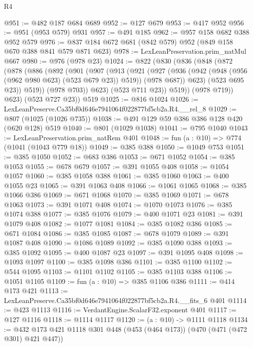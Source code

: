 \begin{lexlean}{R4}
\begin{coremodule}
@951 := @482 @187 @684 @689
@952 := @127 @679
@953 := @417 @952
@956 := @951 (@953 @579) @931
@957 := @491 @185
@962 := @957 @158 @682 @388 @952 @579
@976 := @837 @184 @672 @681 (@842 @579) @952 (@849 @158 @670 @388 @841 @579 @871 @623)
@978 := LexLeanPreservation.prim_natMul @667
@980 := @976 (@978 @23)
@1024 := @822
    (@830
      (@836
        (@848
          (@872
            (@878
              (@886
                (@892
                  (@901
                    (@907
                      (@913
                        (@921
                          (@927
                            (@936
                              (@942 (@948 (@956 (@962 @980 @623) (@523 @679 @23)) @519))
                              (@978 @687))
                            @623)
                          (@523 @695 @23))
                        @519))
                    (@978 @703))
                  @623)
                (@523 @711 @23))
              @519))
          (@978 @719))
        @623)
      (@523 @727 @23))
    @519
@1025 := @816 @1024
@1026 := LexLeanPreserve.Ca35bf0d646e7941064f022877bf5cb2a.R4.__rel_8
@1029 := @807 (@1025 (@1026 @735))
@1038 := @491 @129 @59 @386 @386 @128 @420 (@620 @128) @519
@1040 := @801 (@1029 @1038)
@1041 := @795 @1040
@1043 := LexLeanPreservation.prim_natRem @401
@1048 := fun (a : @10) => @774 (@1041 (@1043 @779 @18))
@1049 := @385 @388
@1050 := @1049 @753
@1051 := @385 @1050
@1052 := @683 @386
@1053 := @671 @1052
@1054 := @385 @1053
@1055 := @678 @679
@1057 := @391 @1055 @408
@1058 := @1054 @1057
@1060 := @385 @1058 @388
@1061 := @385 @1060
@1063 := @400 @1055 @23
@1065 := @391 @1063 @408
@1066 := @1061 @1065
@1068 := @385 @1066 @386
@1069 := @671 @1068
@1070 := @385 @1069
@1071 := @678 @1063
@1073 := @391 @1071 @408
@1074 := @1070 @1073
@1076 := @385 @1074 @388
@1077 := @385 @1076
@1079 := @400 @1071 @23
@1081 := @391 @1079 @408
@1082 := @1077 @1081
@1084 := @385 @1082 @386
@1085 := @671 @1084
@1086 := @385 @1085
@1087 := @678 @1079
@1089 := @391 @1087 @408
@1090 := @1086 @1089
@1092 := @385 @1090 @388
@1093 := @385 @1092
@1095 := @400 @1087 @23
@1097 := @391 @1095 @408
@1098 := @1093 @1097
@1100 := @385 @1098 @386
@1101 := @385 @1100
@1102 := @544 @1095
@1103 := @1101 @1102
@1105 := @385 @1103 @388
@1106 := @1051 @1105
@1109 := fun (a : @10) => @385 @1106 @386
@1111 := @414 @173 @421
@1113 := LexLeanPreserve.Ca35bf0d646e7941064f022877bf5cb2a.R4.__fits_6 @401
@1114 := @423 @1113
@1116 := VerdantEngine.ScalarF32.exponent @401
@1117 := @127 @1116
@1118 := @1114 @1117
@1120 := (a : @10) -> @1111 @1118
@1134 := @432 @173 @421 @1118 @301 @448 (@453 (@464 @173)) (@470 (@471 (@472 @301) @421 @447))

\end{coremodule}
\end{lexlean}
